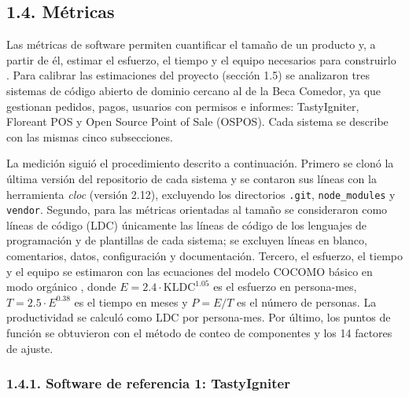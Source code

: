 \subsection{1.4. Métricas}

Las métricas de software permiten cuantificar el tamaño de un producto y, a partir de él, estimar el esfuerzo, el tiempo y el equipo necesarios para construirlo \parencite{pressman2010ingenieria}. Para calibrar las estimaciones del proyecto (sección 1.5) se analizaron tres sistemas de código abierto de dominio cercano al de la Beca Comedor, ya que gestionan pedidos, pagos, usuarios con permisos e informes: TastyIgniter, Floreant POS y Open Source Point of Sale (OSPOS). Cada sistema se describe con las mismas cinco subsecciones.

La medición siguió el procedimiento descrito a continuación. Primero se clonó la última versión del repositorio de cada sistema y se contaron sus líneas con la herramienta \textit{cloc} (versión 2.12), excluyendo los directorios \texttt{.git}, \texttt{node\_modules} y \texttt{vendor}. Segundo, para las métricas orientadas al tamaño se consideraron como líneas de código (LDC) únicamente las líneas de código de los lenguajes de programación y de plantillas de cada sistema; se excluyen líneas en blanco, comentarios, datos, configuración y documentación. Tercero, el esfuerzo, el tiempo y el equipo se estimaron con las ecuaciones del modelo COCOMO básico en modo orgánico \parencite{pressman2010ingenieria}, donde $E = 2.4 \cdot \mathrm{KLDC}^{1.05}$ es el esfuerzo en persona-mes, $T = 2.5 \cdot E^{0.38}$ es el tiempo en meses y $P = E / T$ es el número de personas. La productividad se calculó como LDC por persona-mes. Por último, los puntos de función se obtuvieron con el método de conteo de componentes y los 14 factores de ajuste.

\subsubsection{1.4.1. Software de referencia 1: TastyIgniter}

